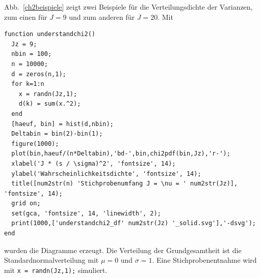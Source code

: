 Abb.~\ref{ch2beispiele} zeigt zwei Beispiele für die Verteilungsdichte der Varianzen, zum einen
für $J = 9$ und zum anderen für $J = 20$. Mit
\begin{lstlisting}[style=Matlab]
function understandchi2()
  Jz = 9;
  nbin = 100;
  n = 10000;
  d = zeros(n,1);
  for k=1:n
    x = randn(Jz,1);
    d(k) = sum(x.^2);
  end
  [haeuf, bin] = hist(d,nbin);
  Deltabin = bin(2)-bin(1);
  figure(1000);
  plot(bin,haeuf/(n*Deltabin),'bd-',bin,chi2pdf(bin,Jz),'r-');
  xlabel('J * (s / \sigma)^2', 'fontsize', 14);
  ylabel('Wahrscheinlichkeitsdichte', 'fontsize', 14);
  title([num2str(n) 'Stichprobenumfang J = \nu = ' num2str(Jz)], 'fontsize', 14);
  grid on;
  set(gca, 'fontsize', 14, 'linewidth', 2);
  print(1000,['understandchi2_df' num2str(Jz) '_solid.svg'],'-dsvg');
end
\end{lstlisting}
wurden die Diagramme erzeugt. Die Verteilung der Grundgesamtheit ist die
Standardnormalverteilung mit $\mu = 0$ und $\sigma = 1$.
Eine Stichprobenentnahme wird mit \texttt{x = randn(Jz,1);} simuliert.

